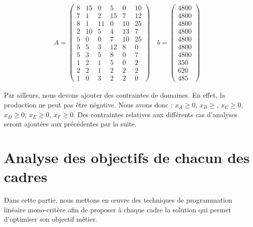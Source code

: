 \documentclass[12pt]{article}
\begin{document}
\begin{align*}
A =
 \begin{pmatrix}
  8	&15	&0 &5& 0 &10\\
7	&1	&2	&15	&7	&12\\
8	&1	&11	&0	&10	&25\\
2	&10	&5	&4	&13	&7\\
5	&0 &0 &7	&10   &25\\
5 &5 &3 &12 &8 &0\\
5 &3 &5 &8 &0 &7\\
1 &2 &1 &5 &0 &2\\
2 &2 &1 &2 &2 &2\\
1 &0 &3 &2 &2 &0
 \end{pmatrix}
  \quad b = 
   \left (
   \begin{aligned}
      4800 \\
      4800 \\
      4800 \\
      4800 \\
      4800 \\
      4800 \\
      4800\\
      350\\
      620\\
      485
   \end{aligned}
   \right ) 
 \end{align*}
 
Par ailleurs, nous devons ajouter des contraintes de domaines. En effet, la production ne peut pas être négative. Nous avons donc :
\(x_{A} \geq 0\), \(x_{B} \geq\), \(x_{C} \geq 0\), \(x_{D} \geq 0\), \(x_{E} \geq 0\), \(x_{F} \geq 0 \).
Des contraintes relatives aux différents cas d'analyses seront ajoutées aux précédentes par la suite.
\section{Analyse des objectifs de chacun des cadres}
Dans cette partie, nous mettons en œuvre des techniques de programmation linéaire mono-critère afin de proposer à chaque cadre la solution qui permet d'optimiser son objectif métier.
\end{document}
